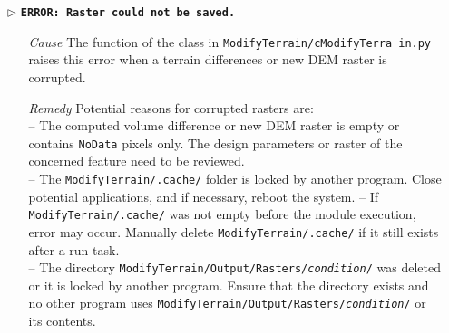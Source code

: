 \begin{itemize}
	\item[$\triangleright$]\textbf{\texttt{ERROR: Raster could not be saved.}}
	\begin{itemize}
		\item[\textit{Cause}\hspace{0.27cm}] The  function of the  class in \texttt{ModifyTerrain/cModifyTerra in.py} raises this error when a terrain differences or new DEM raster is corrupted.
		\item[\textit{Remedy}] Potential reasons for corrupted rasters are:\\
													 -- The computed volume difference or new DEM raster is empty or contains \texttt{NoData} pixels only. The design parameters or raster of the concerned feature need to be reviewed.\\
													 -- The \texttt{ModifyTerrain/.cache/} folder is locked by another program. Close potential applications, and if necessary, reboot the system.
													 -- If \texttt{ModifyTerrain/.cache/} was not empty before the module execution, error may occur. Manually delete \texttt{ModifyTerrain/.cache/} if it still exists after a run task.\\
													 -- The directory \texttt{ModifyTerrain/Output/Rasters/\textit{condition}/} was deleted or it is locked by another program. Ensure that the directory exists and no other program uses \texttt{ModifyTerrain/Output/Rasters/\textit{condition}/} or its contents.\\
	\end{itemize}
	\item[]
	

\end{itemize}
